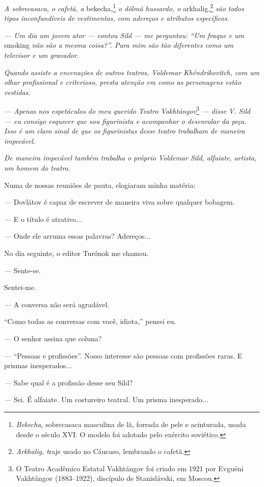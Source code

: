 \emph{A sobrecasaca, o cafetã, a} bekecha\emph{,}\footnote{\emph{Bekecha,}
  sobrecasaca masculina de lã, forrada de pele e acinturada, usada desde
  o século XVI. O modelo foi adotado pelo exército soviético.} \emph{o
dólmã hussardo, o} arkhalig\emph{,}\footnote{\emph{Arkhalig, t}raje
  usado no Cáucaso, lembrando o cafetã.} \emph{são todos tipos
inconfundíveis de vestimentas, com adereços e atributos específicos.}

\emph{--- Um dia um jovem ator --- contou Sild --- me perguntou: ``Um
fraque e um} smoking \emph{não são a mesma coisa?''. Para mim são tão
diferentes como um televisor e um gravador.}

\emph{Quando assiste a encenações de outros teatros, Voldemar
Khéndrikovitch, com um olhar profissional e criterioso, presta atenção
em como as personagens estão vestidas.}

\emph{--- Apenas nos espetáculos do meu querido Teatro
Vakhtángov}\footnote{O Teatro Acadêmico Estatal Vakhtángov foi criado em
  1921 por Evguéni Vakhtángov (1883--1922), discípulo de Stanislávski,
  em Moscou.} \emph{--- disse V. Sild --- eu consigo esquecer que sou
figurinista e acompanhar o desenrolar da peça. Isso é um claro sinal de
que os figurinistas desse teatro trabalham de maneira impecável.}

\emph{De maneira impecável também trabalha o próprio Voldemar Sild,
alfaiate, artista, um homem do teatro.}

Numa de nossas reuniões de pauta, elogiaram minha matéria:

\emph{---} Dovlátov é capaz de escrever de maneira viva sobre qualquer
bobagem.

\emph{---} E o título é atrativo...

\emph{---} Onde ele arruma essas palavras? Adereços...

No dia seguinte, o editor Turónok me chamou.

\emph{---} Sente-se.

Sentei-me.

\emph{---} A conversa não será agradável.

``Como todas as conversas com você, idiota,'' pensei eu.

\emph{---} O senhor assina que coluna?

\emph{---} ``Pessoas e profissões''. Nosso interesse são pessoas com
profissões raras. E prismas inesperados...

\emph{---} Sabe qual é a profissão desse seu Sild?

\emph{---} Sei. É alfaiate. Um costureiro teatral. Um prisma
inesperado...

